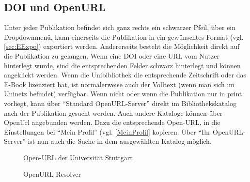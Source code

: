 \subsection{DOI und OpenURL}
Unter jeder Publikation befindet sich ganz rechts ein schwarzer Pfeil, über ein Dropdownmenü, kann einerseits die Publikation in ein gewünschtes Format (vgl.\autoref{sec:EExpo}) exportiert werden. Andererseits besteht die Möglichkeit direkt auf die Publikation zu gelangen. Wenn eine DOI oder eine URL vom Nutzer hinterlegt wurde, sind die entsprechenden Felder schwarz hinterlegt und können angeklickt werden. Wenn die Unibibliothek die entsprechende Zeitschrift oder das E-Book lizenziert hat, ist normalerweise auch der Volltext (wenn man sich im Uninetz befindet) verfügbar. Wenn nicht oder wenn die Publikation nur in print vorliegt, kann über \enquote{Standard OpenURL-Server} direkt im Bibliothekskatalog nach der Publikation gesucht werden. Auch andere Kataloge können über OpenUrl angebunden werden. Dazu die entsprechende Open-URL, in die Einstellungen bei \enquote{Mein Profil} (vgl. \autoref{MeinProfil} kopieren. Über \enquote{Ihr OpenURL-Server} ist nun auch die Suche in dem ausgewählten Katalog möglich.

\begin{figure}[h!]
 \centering
 \caption{Open-URL der Universität Stuttgart}
 \label{figure031}
\end{figure}


\begin{figure}[h!]
 \centering
 \caption{OpenURL-Resolver}
 \label{figure032}
\end{figure}
